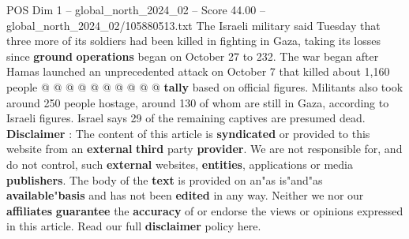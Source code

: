 \begin{textsample}{POS Dim 1 – global\_north\_2024\_02 – Score 44.00 – global\_north\_2024\_02/105880513.txt}
The Israeli military said Tuesday that three more of its soldiers had been killed in fighting in Gaza, taking its losses since \textbf{ground} \textbf{operations} began on October 27 to 232.
The war began after Hamas launched an unprecedented attack on October 7 that killed about 1,160 people @ @ @ @ @ @ @ @ @ @ \textbf{tally} based on official figures.
Militants also took around 250 people hostage, around 130 of whom are still in Gaza, according to Israeli figures.
Israel says 29 of the remaining captives are presumed dead. \textbf{Disclaimer} : The content of this article is \textbf{syndicated} or provided to this website from an \textbf{external} \textbf{third} party \textbf{provider}.
We are not responsible for, and do not control, such \textbf{external} websites, \textbf{entities}, applications or media \textbf{publishers}.
The body of the \textbf{text} is provided on an"as is"and"as \textbf{available}"\textbf{basis} and has not been \textbf{edited} in any way.
Neither we nor our \textbf{affiliates} \textbf{guarantee} the \textbf{accuracy} of or endorse the views or opinions expressed in this article.
Read our full \textbf{disclaimer} policy here.

\end{textsample}
